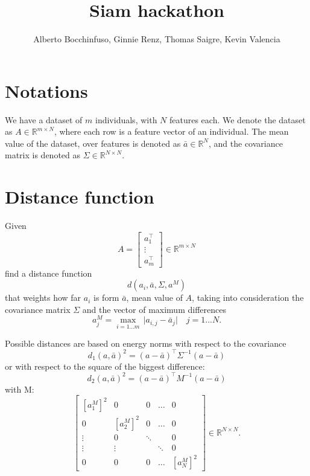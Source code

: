 \documentclass{article}
\author{Alberto Bocchinfuso, Ginnie Renz, Thomas Saigre, Kevin Valencia}
\title{Siam hackathon}
\newcommand{\R}{\mathbb{R}}
\begin{document}
	\maketitle


\section{Notations}

We have a dataset of $m$ individuals, with $N$ features each.
We denote the dataset as $A \in \R^{m \times N}$, where each row is a feature vector of an individual.
The mean value of the dataset, over features is denoted as $\bar{a} \in \R^N$, and the covariance matrix is denoted as $\Sigma \in \R^{N \times N}$.

\section{Distance function}

Given
\begin{equation}
	A = \begin{bmatrix}
		a_1^\top \\
		\vdots \\
		a_m^\top
	\end{bmatrix} \in \R^{m \times N}
\end{equation}
find a distance function
\begin{equation}
	d(a_i, \bar{a}, \Sigma, a^{M})
\end{equation}
that weights how far $a_i$ is form $\bar{a}$, mean value of $A$, taking into consideration the covariance matrix $\Sigma$ and the vector of maximum differences
\begin{equation}
	a^{M}_j = \max_{i=1...m} \, \vert a_{i,j} - \bar{a}_j \vert \quad j=1...N .
\end{equation}

Possible distances are based on energy norms with respect to the covariance
\begin{equation}
	d_1(a, \bar{a})^2 = (a - \bar{a})^\top \Sigma^{-1} (a - \bar{a})
\end{equation}
or with respect to the square of the biggest difference:
\begin{equation}
	d_2(a, \bar{a})^2 = (a - \bar{a})^\top M^{-1} (a - \bar{a})
\end{equation}
with M:
\begin{equation}
\begin{bmatrix}
	\left[ a_1^M \right]^2	&0	&0	&\dots 	&0 \\
	0	&\left[ a_2^M \right]^2	&0	&\dots	&0 \\
	\vdots	&0	&\ddots	&	&0 \\
	\vdots	&\vdots	&	&\ddots	&0 \\
	0	&0	&0	&\dots	&\left[ a_N^M \right]^2
\end{bmatrix} \in \R^{N\times N}.
\end{equation}
\end{document}

